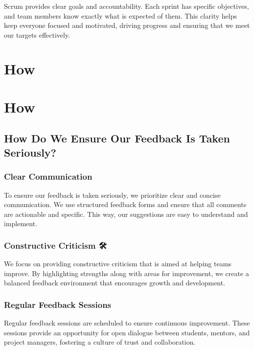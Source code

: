 \documentclass[
  letterpaper,
  DIV=11,
  numbers=noendperiod]{scrreprt}
\begin{document}
Scrum provides clear goals and accountability. Each sprint has specific
objectives, and team members know exactly what is expected of them. This
clarity helps keep everyone focused and motivated, driving progress and
ensuring that we meet our targets effectively.


\chapter{How}\label{how}


\chapter{How}\label{how-1}

\section{How Do We Ensure Our Feedback Is Taken Seriously?
🤔}\label{how-do-we-ensure-our-feedback-is-taken-seriously}

\subsection{Clear Communication 📢}\label{clear-communication}

To ensure our feedback is taken seriously, we prioritize clear and
concise communication. We use structured feedback forms and ensure that
all comments are actionable and specific. This way, our suggestions are
easy to understand and implement.

\subsection{Constructive Criticism 🛠️}\label{constructive-criticism}

We focus on providing constructive criticism that is aimed at helping
teams improve. By highlighting strengths along with areas for
improvement, we create a balanced feedback environment that encourages
growth and development.

\subsection{Regular Feedback Sessions
📅}\label{regular-feedback-sessions}

Regular feedback sessions are scheduled to ensure continuous
improvement. These sessions provide an opportunity for open dialogue
between students, mentors, and project managers, fostering a culture of
trust and collaboration.
\end{document}
